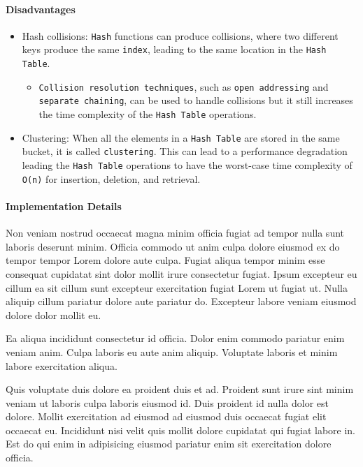 \paragraph{Disadvantages}
\begin{itemize}
    \item{Hash collisions: \lstinline{Hash} functions can produce collisions, where two different keys produce the same \lstinline{index}, leading to the same location in the \lstinline{Hash Table}.}
    \begin{itemize}
        \item{\lstinline{Collision resolution techniques}, such as \lstinline{open addressing} and \lstinline{separate chaining}, can be used to handle collisions but it still increases the time complexity of the \lstinline{Hash Table} operations.}
    \end{itemize}
    \item Clustering: When all the elements in a \lstinline{Hash Table} are stored in the same bucket, it is called \lstinline{clustering}. This can lead to a performance degradation leading the \lstinline{Hash Table} operations to have the worst-case time complexity of \lstinline{O(n)} for insertion, deletion, and retrieval.
\end{itemize}

\paragraph{Implementation Details}
Non veniam nostrud occaecat magna minim officia fugiat ad tempor nulla sunt laboris deserunt minim. Officia commodo ut anim culpa dolore eiusmod ex do tempor tempor Lorem dolore aute culpa. Fugiat aliqua tempor minim esse consequat cupidatat sint dolor mollit irure consectetur fugiat. Ipsum excepteur eu cillum ea sit cillum sunt excepteur exercitation fugiat Lorem ut fugiat ut. Nulla aliquip cillum pariatur dolore aute pariatur do. Excepteur labore veniam eiusmod dolore dolor mollit eu.

Ea aliqua incididunt consectetur id officia. Dolor enim commodo pariatur enim veniam anim. Culpa laboris eu aute anim aliquip. Voluptate laboris et minim labore exercitation aliqua.

Quis voluptate duis dolore ea proident duis et ad. Proident sunt irure sint minim veniam ut laboris culpa laboris eiusmod id. Duis proident id nulla dolor est dolore. Mollit exercitation ad eiusmod ad eiusmod duis occaecat fugiat elit occaecat eu. Incididunt nisi velit quis mollit dolore cupidatat qui fugiat labore in. Est do qui enim in adipisicing eiusmod pariatur enim sit exercitation dolore officia.

